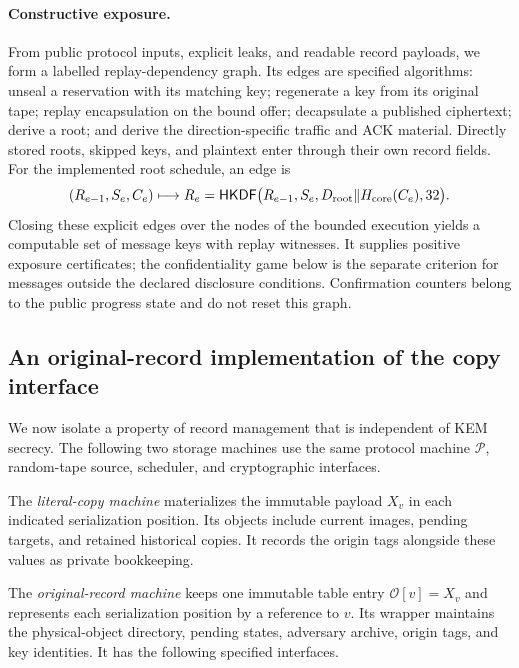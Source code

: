 \paragraph{Constructive exposure.}
From public protocol inputs, explicit leaks, and readable record payloads, we
form a labelled replay-dependency graph.  Its edges are specified algorithms:
unseal a reservation with its matching key; regenerate a key from its original
tape; replay encapsulation on the bound offer; decapsulate a published
ciphertext; derive a root; and derive the direction-specific traffic and ACK
material.  Directly stored roots, skipped keys, and plaintext enter through
their own record fields.  For the implemented root schedule, an edge is
\[
 (R_{e-1},S_e,C_e)\longmapsto
 R_e=\mathsf{HKDF}\bigl(R_{e-1},S_e,
       D_{\rm root}\Vert H_{\rm core}(C_e),32\bigr).
\]
Closing these explicit edges over the nodes of the bounded execution yields
a computable set of message keys with replay witnesses.  It supplies positive
exposure certificates; the
confidentiality game below is the separate criterion for messages outside
the declared disclosure conditions.  Confirmation counters belong to the
public progress state and do not reset this graph.

\subsection{An original-record implementation of the copy interface}

We now isolate a property of record management that is independent of KEM
secrecy.  The following two storage machines use the same protocol machine
$\mathcal P$, random-tape source, scheduler, and cryptographic interfaces.

The \emph{literal-copy machine} materializes the immutable payload $X_v$ in
each indicated serialization position.  Its objects include current images,
pending targets, and retained historical copies.  It records the origin tags
alongside these values as private bookkeeping.

The \emph{original-record machine} keeps one immutable table entry
$\mathcal O[v]=X_v$ and represents each serialization position by a reference
to $v$.  Its wrapper maintains the physical-object directory, pending states,
adversary archive, origin tags, and key identities.  It has the following
specified interfaces.

